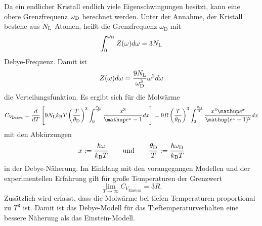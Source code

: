 Da ein endlicher Kristall endlich viele Eigenschwingungen besitzt, kann eine obere Grenzfrequenz $\omega_\text D$ berechnet werden. 
Unter der Annahme, der Kristall bestehe aus $N_\text L$ Atomen, heißt die Grenzfrequenz $\omega_\text{D}$ mit 
\begin{equation}
	\int_0^{\omega_\text D} Z(\omega) d\omega = 3 N_\text L
	\label{eqn:wd}
\end{equation}
Debye-Frequenz.
Damit ist 
\begin{equation}
	Z(\omega)d\omega = \frac{9 N_\text L}{\omega_\text D ^3}\omega^2 d\omega
	\label{eqn:z2}
\end{equation}
die Verteilungsfunktion.
Es ergibt sich für die Molwärme
\begin{equation}
	C_{V_\text{Debye}} = \frac{d}{dT}\left[9 N_\text L k_\text B T \left(\frac{T}{\theta_\text D}\right)^3 \int_0^{\frac{\theta_\text D}{T}} \frac{x^3}{\mathup e^x -1} dx \right] = 9 R \left(\frac{T}{\theta_\text D}\right)^3 \int_0^{\frac{\theta_\text D}{T}} \frac{x^4\mathup e^x}{\mathup (e^x -1)^2} dx
	\label{eqn:cvd}
\end{equation}
mit den Abkürzungen
\begin{equation*}
	x := \frac{\hbar\omega}{k_\text B T}\qquad\text{und}\qquad \frac{\theta_\text D}{T} :=\frac{\hbar\omega_\text D }{k_\text B T}
\end{equation*}
in der Debye-Näherung.
Im Einklang mit den vorangegangen Modellen und der experimentellen Erfahrung gilt für große Temperaturen der Grenzwert 
\begin{equation}
	\lim_{T\to\infty} C_{V_\text{Einstein}} = 3R.
\end{equation}
Zusätzlich wird erfasst, dass die Molwärme bei tiefen Temperaturen  proportional zu $T^3$ ist. 
Damit ist das Debye-Modell für das Tieftemperaturverhalten eine bessere Näherung als das Einstein-Modell.